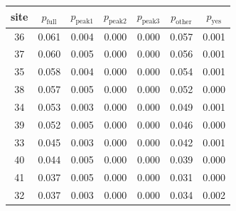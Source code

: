 \begin{tabular}{ccccccc}
\toprule
site & $p_{\mathrm{full}}$ & $p_{\mathrm{peak1}}$ & $p_{\mathrm{peak2}}$ & $p_{\mathrm{peak3}}$ & $p_{\mathrm{other}}$ & $p_{\mathrm{yes}}$ \\
\midrule
36 & 0.061 & 0.004 & 0.000 & 0.000 & 0.057 & 0.001 \\
37 & 0.060 & 0.005 & 0.000 & 0.000 & 0.056 & 0.001 \\
35 & 0.058 & 0.004 & 0.000 & 0.000 & 0.054 & 0.001 \\
38 & 0.057 & 0.005 & 0.000 & 0.000 & 0.052 & 0.000 \\
34 & 0.053 & 0.003 & 0.000 & 0.000 & 0.049 & 0.001 \\
39 & 0.052 & 0.005 & 0.000 & 0.000 & 0.046 & 0.000 \\
33 & 0.045 & 0.003 & 0.000 & 0.000 & 0.042 & 0.001 \\
40 & 0.044 & 0.005 & 0.000 & 0.000 & 0.039 & 0.000 \\
41 & 0.037 & 0.005 & 0.000 & 0.000 & 0.031 & 0.000 \\
32 & 0.037 & 0.003 & 0.000 & 0.000 & 0.034 & 0.002 \\
\bottomrule
\end{tabular}
